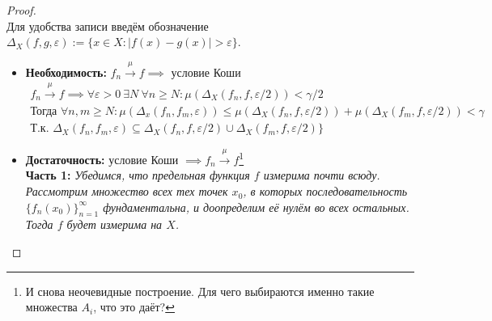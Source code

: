 \documentclass[11pt,a4paper]{report}
\def\eps{\varepsilon}
\theoremstyle{definition}
\theoremstyle{definition}
\theoremstyle{definition}
\begin{document}
		\begin{proof}$  $\\
			Для удобства записи введём обозначение $ \Delta_{X}(f, g, \eps) := \{ x \in X: |f(x) - g(x)| > \eps \} $.
			\begin{itemize}
				\item \textbf{Необходимость:} $ f_{n} \xrightarrow{\mu} f \implies $ условие Коши
					\begin{gather*}
						f_{n} \xrightarrow{\mu} f \implies \forall \eps > 0\ \exists N\ \forall n \ge N: \mu(\Delta_{X}(f_{n}, f, \eps/2)) < \gamma/2\\
						\mbox{Тогда } \forall n, m \ge N: \mu(\Delta_{x}(f_{n}, f_{m}, \eps)) \le \mu(\Delta_{X}(f_{n}, f, \eps/2)) + \mu(\Delta_{X}(f_{m}, f, \eps/2)) < \gamma\\
						\mbox{Т.к. } \Delta_{X}(f_{n}, f_{m}, \eps) \subseteq \Delta_{X}(f_{n}, f, \eps/2) \cup \Delta_{X}(f_{m}, f, \eps/2) \} 
					\end{gather*}
				\item \textbf{Достаточность:} условие Коши $ \implies f_{n} \xrightarrow{\mu} f $\footnote{И снова неочевидные построение. Для чего выбираются именно такие множества $ A_{i} $, что это даёт?}\\
				\textbf{Часть 1:} \textit{Убедимся, что предельная функция $ f $ измерима почти всюду. Рассмотрим множество всех тех точек $ x_{0} $, в которых последовательность $ \{f_{n}(x_{0})\}_{n=1}^{\infty} $ фундаментальна, и доопределим её нулём во всех остальных. Тогда $ f $ будет измерима на $ X $.}\\
				

\end{itemize}
\end{proof}
\end{document}
